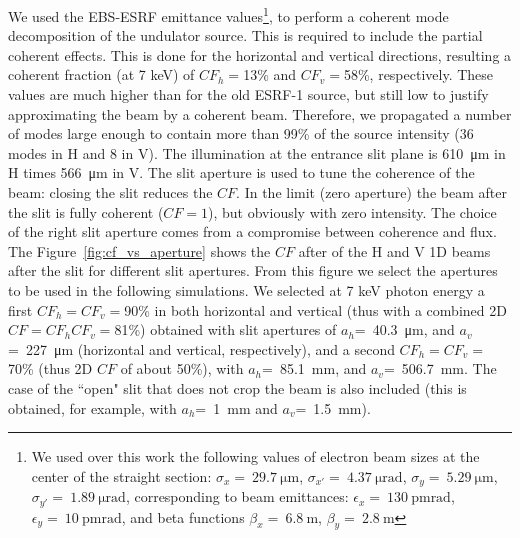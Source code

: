 \documentclass{iucr}              %
\begin{document}
We used the EBS-ESRF emittance values\footnote{We used over this work the following values of electron beam sizes at the center of the straight section: $\sigma_x=~\SI{29.7}{\micro\meter}$,
$\sigma_{x'}=~\SI{4.37}{\micro\radian}$,
$\sigma_y=~\SI{5.29}{\micro\meter}$,
$\sigma_{y'}=~\SI{1.89}{\micro\radian}$, corresponding to beam emittances:  $\epsilon_x=~\SI{130}{\pico\meter \radian}$,
$\epsilon_y=~\SI{10}{\pico\meter \radian}$, and beta functions
$\beta_x=~\SI{6.8}{\meter}$,
$\beta_y=~\SI{2.8}{\meter}$
},
to perform a coherent mode decomposition of the undulator source. This is required to include the partial coherent effects. This is done for the horizontal and vertical directions, resulting a coherent fraction (at 7 keV) of $CF_h=$13\% and $CF_v=$58\%, respectively. These values are much higher than for the old ESRF-1 source, but still low to justify approximating the beam by a coherent beam. Therefore, we propagated a number of modes large enough to contain more than 99\% of the source intensity (36 modes in H and 8 in V). The illumination at the entrance slit plane is \SI{610}{\micro\meter} in H times \SI{566}{\micro\meter} in V. The slit aperture is used to tune the coherence of the beam: closing the slit reduces the $CF$. In the limit (zero aperture) the beam after the slit is fully coherent ($CF=1$), but obviously with zero intensity. The choice of the right slit aperture comes from a compromise between coherence and flux. The Figure~\ref{fig:cf_vs_aperture} shows the $CF$ after of the H and V 1D beams after the slit for different slit apertures. From this figure we select the apertures to be used in the following simulations. We selected at 7 keV photon energy a first $CF_h=CF_v=$90\% in both horizontal and vertical (thus with a combined 2D  $CF=CF_h CF_v=$81\%) obtained with slit apertures of
$a_h$=~\SI{40.3}{\micro\meter}, and 
$a_v$=~\SI{227}{\micro\meter} (horizontal and vertical, respectively), and a second $CF_h=CF_v=$70\% (thus 2D $CF$ of about 50\%), with 
$a_h$=~\SI{85.1}{\milli\meter}, and 
$a_v$=~\SI{506.7}{\milli\meter}. The case of the ``open" slit that does not crop the beam is also included (this is obtained, for example, with $a_h$=~\SI{1}{\milli\meter} and $a_v$=~\SI{1.5}{\milli\meter}).

%
\end{document}
